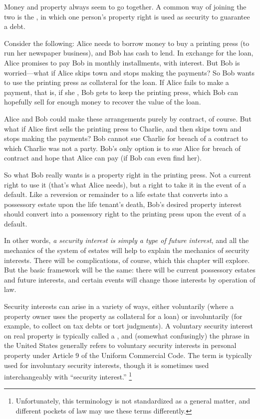 Money and property always seem to go together. A common way of joining the
two is the , in which one person's property right is
used as security to guarantee a debt.

Consider the following: Alice needs to borrow money to buy a printing press (to
run her newspaper business), and Bob has cash to lend. In exchange for the
loan, Alice promises to pay Bob in monthly installments, with interest. But Bob
is worried---what if Alice skips town and stops making the payments? So Bob
wants to use the printing press as collateral for the loan. If Alice fails to
make a payment, that is, if she , Bob gets to keep the
printing press, which Bob can hopefully sell for enough money to recover the
value of the loan.


Alice and Bob could make these arrangements purely by contract, of course. But
what if Alice first sells the printing press to Charlie, and then skips town and
stops making the payments? Bob cannot sue Charlie for breach of a contract to
which Charlie was not a party. Bob's only option is to sue Alice for breach of
contract and hope that Alice can pay (if Bob can even find her).

So what Bob really wants is a property right in the printing press. Not a
current right to use it (that's what Alice needs), but a right to take it in the
event of a default. Like a reversion or remainder to a life estate that converts
into a possessory estate upon the life tenant's death, Bob's desired property
interest should convert into a possessory right to the printing press upon the
event of a default.

In other words, \emph{a security interest is simply a type of future interest},
and all the mechanics of the system of estates will help to explain the
mechanics of security interests. There will be complications, of course, which
this chapter will explore. But the basic framework will be the same: there will
be current possessory estates and future interests, and certain events will
change those interests by operation of law.

Security interests can arise in a variety of ways, either voluntarily (where a
property owner uses the property as collateral for a loan) or involuntarily
(for example, to collect on tax debts or tort judgments). A voluntary security
interest on real property is typically called a , and (somewhat
confusingly) the phrase  in the United States
generally
refers to voluntary security interests in personal property under Article 9 of
the Uniform Commercial Code. The term  is typically used for
involuntary
security interests, though it is sometimes used interchangeably with ``security
interest.'' \unskip\footnote{Unfortunately, this terminology is not standardized
as a general matter, and different pockets of law may use these terms
differently.}

